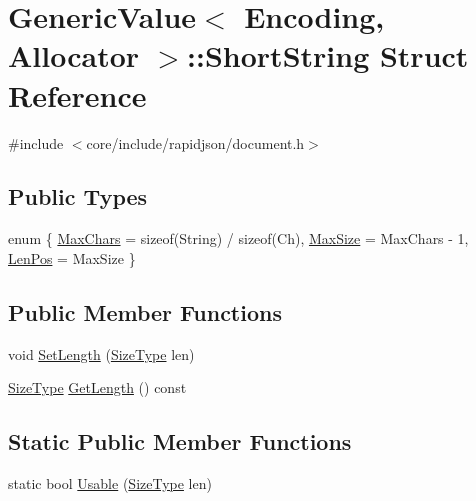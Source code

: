 \hypertarget{structGenericValue_1_1ShortString}{}\section{Generic\+Value$<$ Encoding, Allocator $>$\+:\+:Short\+String Struct Reference}
\label{structGenericValue_1_1ShortString}


{\ttfamily \#include $<$core/include/rapidjson/document.\+h$>$}

\subsection*{Public Types}
\begin{DoxyCompactItemize}
\item 
enum \{ \hyperlink{structGenericValue_1_1ShortString_a9458c3a0d0eda7bac977cb41f1a19360a6b29cffcea816906d271656a958bc0c7}{Max\+Chars} = sizeof(String) / sizeof(Ch), 
\hyperlink{structGenericValue_1_1ShortString_a9458c3a0d0eda7bac977cb41f1a19360a991735d2e27155ccabe1c657653044ba}{Max\+Size} = Max\+Chars -\/ 1, 
\hyperlink{structGenericValue_1_1ShortString_a9458c3a0d0eda7bac977cb41f1a19360ac4ec681af40f3f6cfe7dcf6500637364}{Len\+Pos} = Max\+Size
 \}
\end{DoxyCompactItemize}
\subsection*{Public Member Functions}
\begin{DoxyCompactItemize}
\item 
void \hyperlink{structGenericValue_1_1ShortString_adbfe8461e0cb0ccb2cb3825489e743c2}{Set\+Length} (\hyperlink{rapidjson_8h_a5ed6e6e67250fadbd041127e6386dcb5}{Size\+Type} len)
\item 
\hyperlink{rapidjson_8h_a5ed6e6e67250fadbd041127e6386dcb5}{Size\+Type} \hyperlink{structGenericValue_1_1ShortString_a65bea5171312b2243a1ec70ec6fa93cd}{Get\+Length} () const 
\end{DoxyCompactItemize}
\subsection*{Static Public Member Functions}
\begin{DoxyCompactItemize}
\item 
static bool \hyperlink{structGenericValue_1_1ShortString_a73e40f625c1abbd84f95ac7fff8365f7}{Usable} (\hyperlink{rapidjson_8h_a5ed6e6e67250fadbd041127e6386dcb5}{Size\+Type} len)
\end{DoxyCompactItemize}
